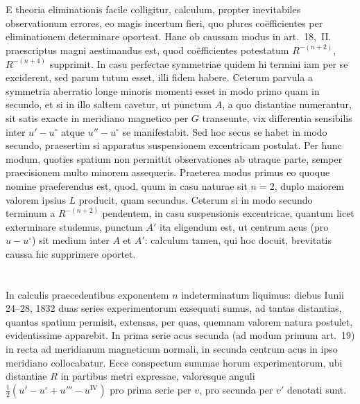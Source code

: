 \documentclass[fontsize=11pt,paper=a4,twoside,openany]{scrbook}
\begin{document}
\section{}

E theoria eliminationis facile colligitur, calculum, propter inevitabiles observationum errores, eo magis incertum fieri, quo plures coëfficientes per eliminationem determinare oporteat. Hanc ob caussam modus in art.~18,~II. praescriptus magni aestimandus est, quod coëfficientes potestatum $R^{-(n+2)}$, $R^{-(n+4)}$ supprimit. In casu perfectae symmetriae quidem hi termini iam per se exciderent, sed parum tutum esset, illi fidem habere. Ceterum parvula a symmetria aberratio longe minoris momenti esset in modo primo quam in secundo, et si in illo saltem cavetur, ut punctum $A$, a quo distantiae numerantur, sit satis exacte in meridiano magnetico per $G$ transeunte, vix differentia sensibilis inter $u'-u^{\circ}$ atque $u''-u^{\circ}$ se manifestabit. Sed hoc secus se habet in modo secundo, praesertim si apparatus suspensionem excentricam postulat. Per hunc modum, quoties spatium non permittit observationes ab utraque parte, semper praecisionem multo minorem assequeris. Praeterea modus primus eo quoque nomine praeferendus est, quod, quum in casu naturae sit $n=2$, duplo maiorem valorem ipsius $L$ producit, quam secundus. Ceterum si in modo secundo terminum a $R^{-(n+2)}$ pendentem, in casu suspensionis excentricae, quantum licet exterminare studemus, punctum $A'$ ita eligendum est, ut centrum acus (pro $u-u^{\circ}$) sit medium inter $A$ et $A'$: calculum tamen, qui hoc docuit, brevitatis caussa hic supprimere oportet.

\section{}

In calculis praecedentibus exponentem $n$ indeterminatum liquimus: diebus Iunii 24--28, 1832 duas series experimentorum exsequuti sumus, ad tantas distantias, quantas spatium permisit, extensas, per quas, quemnam valorem natura postulet, evidentissime apparebit. In prima serie acus secunda (ad modum primum art.~19) in recta ad meridianum magneticum normali, in secunda centrum acus in ipso meridiano collocabatur. Ecce conspectum summae horum experimentorum, ubi distantiae $R$ in partibus metri expressae, valoresque anguli $\frac{1}{2}(u'-u^{\circ}+u'''-u^{\mathrm{IV}})$ pro prima serie per $v$, pro secunda per $v'$ denotati sunt.
\end{document}
